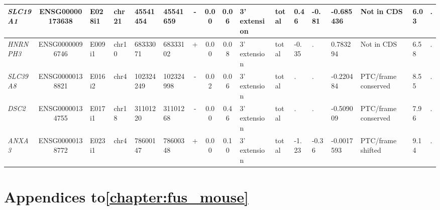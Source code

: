 \begin{appendices}
\begin{landscape}
\begin{table}
{\begin{tabular}{|l|c|l|l|l|l|c|c|c|l|l|l|l|l|l|l|l|}
		\textit{SLC19A1} & ENSG00000173638 & E028i1 & chr21 & 45541454 & 45541659 & -     & 0.00  & 0.06  & 3' extension & total & 0.46  & -0.81 & -0.685436 & Not in CDS     & 6.03  & . \\ \hline
		\textit{HNRNPH3} & ENSG00000096746 & E009i1 & chr10 & 68333071 & 68333102 & +     & 0.00  & 0.08  & 3' extension & total & -0.35 & . & 0.783294 & Not in CDS     & 6.58  & . \\ \hline
		\textit{SLC39A8} & ENSG00000138821 & E016i2 & chr4  & 102324249 & 102324998 & -     & 0.02  & 0.06  & 3' extension & total & . & . & -0.220484 & PTC/frame conserved & 8.55  & . \\ \hline
		\textit{DSC2} & ENSG00000134755 & E017i1 & chr18 & 31101220 & 31101268 & -     & 0.00  & 0.46  & 3' extension & total & . & . & -0.509009 & PTC/frame conserved & 7.96  & . \\ \hline
		\textit{ANXA3} & ENSG00000138772 & E023i1 & chr4  & 78600147 & 78600348 & +     & 0.00  & 0.10  & 3' extension & total & -1.23 & -0.36 & -0.0017593 & PTC/frame shifted & 9.14  & . \\ \hline
	\end{tabular}%
	} 
\end{table}%

\end{landscape}

\addtolength{\abovecaptionskip}{25mm}

\clearpage


\section*{Appendices to\autoref{chapter:fus_mouse} }


\end{appendices}
